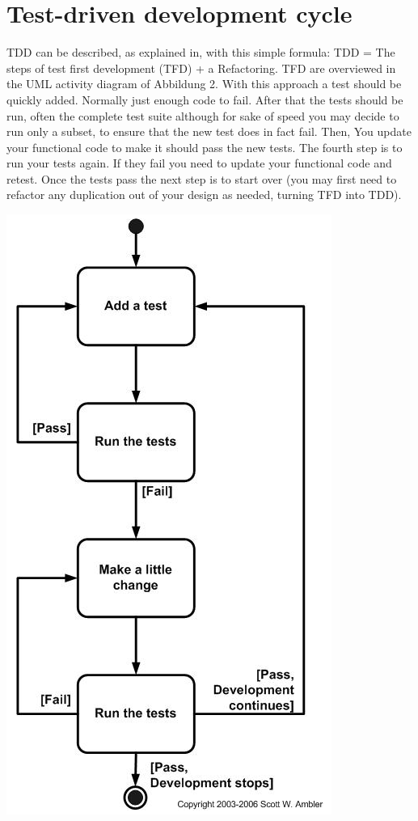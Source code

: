 \documentclass[11pt]{article}
\begin{document}
\section{Test-driven development cycle}
TDD can be described, as explained in, with this simple formula: TDD = The steps of test first development (TFD) + a Refactoring. TFD are overviewed in the UML activity diagram of Abbildung 2. With this approach a test should be quickly added. Normally just enough code to fail. After that the tests should be run, often the complete test suite although for sake of speed you may decide to run only a subset, to ensure that the new test does in fact fail. Then, You update your functional code to make it should pass the new tests. The fourth step is to run your tests again. If they fail you need to update your functional code and retest. Once the tests pass the next step is to start over (you may first need to refactor any duplication out of your design as needed, turning TFD into TDD).

\includegraphics[scale=0.8]{TFD.png}
\end{document}
